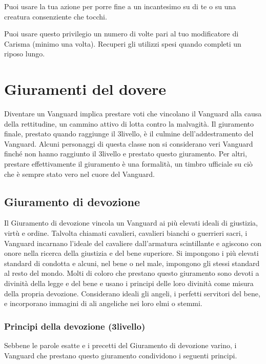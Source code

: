 \documentclass[a4paper,10pt,twoside,twocolumn,openany,bg=full,nodeprecatedcode]{dndbook}
\begin{document}
Puoi usare la tua azione per porre fine a un incantesimo su di te o su una creatura consenziente che tocchi.

Puoi usare questo privilegio un numero di volte pari al tuo modificatore di Carisma (minimo una volta).
Recuperi gli utilizzi spesi quando completi un riposo lungo.

\section{Giuramenti del dovere}

Diventare un Vanguard implica prestare voti che vincolano il Vanguard alla causa della rettitudine, un cammino attivo di lotta contro la malvagità.
Il giuramento finale, prestato quando raggiunge il 3\degree livello, è il culmine dell'addestramento del Vanguard.
Alcuni personaggi di questa classe non si considerano veri Vanguard finché non hanno raggiunto il 3\degree livello e prestato questo giuramento.
Per altri, prestare effettivamente il giuramento è una formalità, un timbro ufficiale su ciò che è sempre stato vero nel cuore del Vanguard.

\subsection{Giuramento di devozione}

Il Giuramento di devozione vincola un Vanguard ai più elevati ideali di giustizia, virtù e ordine.
Talvolta chiamati cavalieri, cavalieri bianchi o guerrieri sacri, i Vanguard incarnano l'ideale del cavaliere dall'armatura scintillante e agiscono con onore nella ricerca della giustizia e del bene superiore.
Si impongono i più elevati standard di condotta e alcuni, nel bene o nel male, impongono gli stessi standard al resto del mondo.
Molti di coloro che prestano questo giuramento sono devoti a divinità della legge e del bene e usano i principi delle loro divinità come misura della propria devozione.
Considerano ideali gli angeli, i perfetti servitori del bene, e incorporano immagini di ali angeliche nei loro elmi o stemmi.

\subsubsection{Principi della devozione (3\degree livello)}

Sebbene le parole esatte e i precetti del Giuramento di devozione varino, i Vanguard che prestano questo giuramento condividono i seguenti principi.
\end{document}
